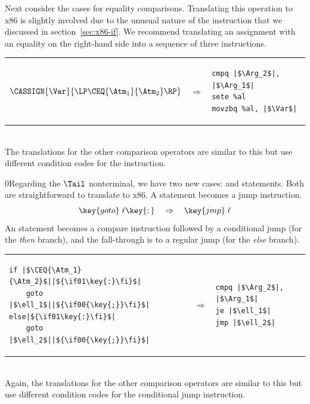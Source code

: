 \documentclass[7x10]{TimesAPriori_MIT}%
\def\racketEd{0}
\def\pythonEd{1}
\def\edition{0}
\newcommand{\racket}[1]{{\if\edition\racketEd{#1}\fi}}
\newcommand{\python}[1]{{\if\edition\pythonEd #1\fi}}
\numberwithin{theorem}{chapter}
\numberwithin{definition}{chapter}
\numberwithin{equation}{chapter}
\begin{document}
Next consider the cases for equality comparisons.  Translating this
operation to x86 is slightly involved due to the unusual nature of the
 instruction that we discussed in section~\ref{sec:x86-if}.
We recommend translating an assignment with an equality on the
right-hand side into a sequence of three instructions. \\
\begin{tabular}{lll}
\begin{minipage}{0.4\textwidth}
$\CASSIGN{\Var}{ \LP\CEQ{\Atm_1}{\Atm_2} \RP }$ 
\end{minipage}
&
$\Rightarrow$
&
\begin{minipage}{0.4\textwidth}
\begin{lstlisting}
cmpq |$\Arg_2$|, |$\Arg_1$|
sete %al
movzbq %al, |$\Var$|
\end{lstlisting}
\end{minipage}
\end{tabular}  \\
The translations for the other comparison operators are similar to
this but use different condition codes for the  instruction.

\racket{Regarding the $\Tail$ nonterminal, we have two new cases:
  \key{goto} and \key{if} statements. Both are straightforward to
  translate to x86.}
%
A  statement becomes a jump instruction.
\[
\key{goto}\; \ell\racket{\key{;}} \quad \Rightarrow \quad \key{jmp}\;\ell
\]
%
An  statement becomes a compare instruction followed by a
conditional jump (for the \emph{then} branch), and the fall-through is to
a regular jump (for the \emph{else} branch).\\
\begin{tabular}{lll}
\begin{minipage}{0.4\textwidth}
\begin{lstlisting}
if |$\CEQ{\Atm_1}{\Atm_2}$||$\python{\key{:}}$|
    goto |$\ell_1$||$\racket{\key{;}}$|
else|$\python{\key{:}}$|
    goto |$\ell_2$||$\racket{\key{;}}$|
\end{lstlisting}
\end{minipage}
&
$\Rightarrow$
&
\begin{minipage}{0.4\textwidth}
\begin{lstlisting}
cmpq |$\Arg_2$|, |$\Arg_1$|
je |$\ell_1$|
jmp |$\ell_2$|
\end{lstlisting}
\end{minipage}
\end{tabular}  \\
Again, the translations for the other comparison operators are similar to this
but use different condition codes for the conditional jump instruction.
\end{document}
